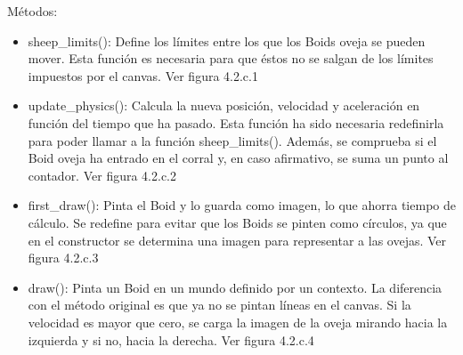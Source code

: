 Métodos:
\begin{itemize}
\item sheep\_limits(): Define los límites entre los que los Boids oveja se pueden mover. Esta función es necesaria para que éstos no se 
salgan de los límites impuestos por el canvas. Ver figura 4.2.c.1

\item  update\_physics(): Calcula la nueva posición, velocidad y aceleración en función del tiempo que ha pasado. Esta función ha sido 
necesaria redefinirla para poder llamar a la función sheep\_limits(). Además, se comprueba si el Boid oveja ha entrado en el corral y, en 
caso afirmativo, se suma un punto al contador. Ver figura 4.2.c.2

\item  first\_draw():  Pinta el Boid y lo guarda como imagen, lo que ahorra tiempo de cálculo. Se redefine para evitar que los Boids se 
pinten como círculos, ya que en el constructor se determina una imagen para representar a las ovejas. Ver figura 4.2.c.3

\item  draw(): Pinta un Boid en un mundo definido por un contexto. La diferencia con el método original es que ya no se pintan líneas en 
el canvas. Si la velocidad es mayor que cero, se carga la imagen de la oveja mirando hacia la izquierda y si no, hacia la derecha. 
Ver figura 4.2.c.4

\end{itemize}

